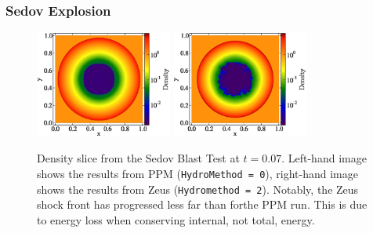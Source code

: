 \subsubsection{Sedov Explosion}
\label{sec.tests.sedov}

\begin{figure}
\begin{center}
\includegraphics[width=0.4\textwidth]{figures/sedov-ppm-slice.eps}
\includegraphics[width=0.4\textwidth]{figures/sedov-zeus-slice.eps}
\caption{Density slice from the Sedov Blast Test at $t = 0.07$. Left-hand image shows the results from PPM ({\tt HydroMethod = 0}), right-hand image shows the results from Zeus ({\tt Hydromethod = 2}). Notably, the Zeus shock front has progressed less far than forthe PPM run. This is due to energy loss when conserving internal, not total, energy.}
\label{fig.sedov1}
\end{center}
\end{figure}


